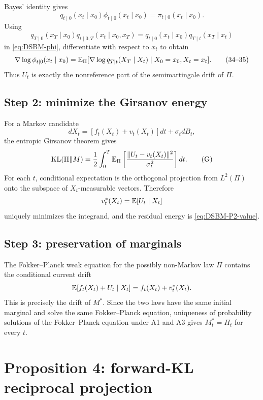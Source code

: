 Bayes' identity gives
\[
 q_{t\mid0}(x_t\mid x_0)\phi_{t\mid0}(x_t\mid x_0)
 =\pi_{t\mid0}(x_t\mid x_0).
\]
Using
\[
 q_{T\mid0}(x_T\mid x_0)q_{t\mid0,T}(x_t\mid x_0,x_T)
 =q_{t\mid0}(x_t\mid x_0)q_{T\mid t}(x_T\mid x_t)
\]
in \eqref{eq:DSBM-phi}, differentiate with respect to \(x_t\) to obtain
\begin{equation}
 \nabla\log\phi_{t\mid0}(x_t\mid x_0)
 =\mathbb{E}_\Pi[\nabla\log q_{T\mid t}(X_T\mid X_t)
          \mid X_0=x_0,X_t=x_t].
 \tag{34--35}\label{eq:DSBM-phi-score}
\end{equation}
Thus \(U_t\) is exactly the nonreference part of the semimartingale drift of \(\Pi\).

\subsection{Step 2: minimize the Girsanov energy}
For a Markov candidate
\[
 dX_t=[f_t(X_t)+v_t(X_t)]dt+\sigma_t dB_t,
\]
the entropic Girsanov theorem \cite{Leonard2012Girsanov} gives
\begin{equation}
 \mathrm{KL}(\Pi\|M)
 =\frac12\int_0^T\mathbb{E}_\Pi
 \left[\frac{\|U_t-v_t(X_t)\|^2}{\sigma_t^2}\right]dt.
 \tag{G}\label{eq:DSBM-girsanov-objective}
\end{equation}
For each \(t\), conditional expectation is the orthogonal projection from \(L^2(\Pi)\) onto the subspace of \(X_t\)-measurable vectors.  Therefore
\[
 v_t^*(X_t)=\mathbb{E}[U_t\mid X_t]
\]
uniquely minimizes the integrand, and the residual energy is \eqref{eq:DSBM-P2-value}.

\subsection{Step 3: preservation of marginals}
The Fokker--Planck weak equation for the possibly non-Markov law \(\Pi\) contains the conditional current drift
\[
 \mathbb{E}[f_t(X_t)+U_t\mid X_t]
 =f_t(X_t)+v_t^*(X_t).
\]
This is precisely the drift of \(M^*\).  Since the two laws have the same initial marginal and solve the same Fokker--Planck equation, uniqueness of probability solutions of the Fokker--Planck equation \cite{BogachevKrasovitskiiShaposhnikov2021} under A1 and A3 gives \(M_t^*=\Pi_t\) for every \(t\).

\section{Proposition 4: forward-KL reciprocal projection}

